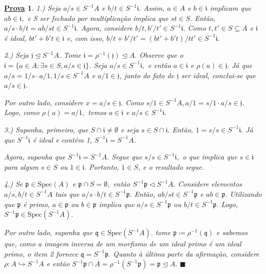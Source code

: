 \documentclass{article}
\newtheorem*{proof*}{\underline{Prova}}
\renewcommand\qedsymbol{$\blacksquare$}
\begin{document}
    \begin{proof*}
      1.) Seja \(a/s\in S^{-1}A\) e \(b/t\in S^{-1}\mathfrak{i}.\) Assim, \(a\in A\) e \(b\in \mathfrak{i}\) implicam
      que \(ab\in \mathfrak{i},\) e S ser fechado por multiplicação implica que \(st\in S.\) Então, \(a/s \cdot b/t = ab/st\in S^{-1}\mathfrak{i}.\)
      Agora, considere \(b/t, b'/t'\in S^{-1}\mathfrak{i}.\) Como \(t, t'\in S\subseteq A\) e \(\mathfrak{i}\) é ideal, \(bt'+b't\in \mathfrak{i}\) e,
      com isso, \(b/t + b'/t' = (bt'+b't)/t t'\in S^{-1}\mathfrak{i}.\)

      2.) Seja \(\mathfrak{j}\trianglelefteq{S^{-1}A}.\) Tome \(\mathfrak{i} = \rho^{-1}(\mathfrak{j})\trianglelefteq{A}.\) Observe que o
      \(\mathfrak{i} = \{a\in A:\exists s\in S, a/s\in \mathfrak{j}\}\). Seja \(a/s\in S^{-1}\mathfrak{i},\) e então
      \(a\in \mathfrak{i}\) e \(\rho (a)\in \mathfrak{j}.\) Já que \(a/s = 1/s \cdot a/1, 1/s\in S^{-1}A\) e \(a/1\in \mathfrak{j}\),
      junto do fato de \(\mathfrak{j}\) ser ideal, conclui-se que \(a/s\in \mathfrak{j}.\)

      Por outro lado, considere \(x=a/s\in \mathfrak{j}.\) Como \(s/1\in S^{-1}A, a/1 = s/1 \cdot a/s\in \mathfrak{j}.\) Logo, 
      como \(\rho (a) = a/1,\) temos \(a\in \mathfrak{i}\) e \(a/s\in S^{-1}\mathfrak{i}.\)

      3.) Suponha, primeiro, que \(S\cap \mathfrak{i} \neq\emptyset\) e seja \(s\in S\cap \mathfrak{i}.\) Então,
      \(1 = s/s\in S^{-1}\mathfrak{i}.\) Já que \(S^{-1}\mathfrak{i}\) é ideal e contém 1, \(S^{-1}\mathfrak{i} = S^{-1}A.\)

      Agora, suponha que \(S^{-1}\mathfrak{i} = S^{-1}A.\) Segue que \(s/s\in S^{-1}\mathfrak{i},\) o que implica que \(s\in \mathfrak{i}\) para algum
      \(s\in S\) ou \(1\in \mathfrak{i}.\) Portanto, \(1\in S\), e o resultado segue.

      4.) Se \(\mathfrak{p}\in \mathrm{Spec}(A)\) e \(\mathfrak{p}\cap S = \emptyset,\) então \(S^{-1}\mathfrak{p}\vartriangleleft S^{-1}A.\)
      Considere elementos \(a/s, b/t\in S^{-1}A\) tais que \(a/s \cdot b/t\in S^{-1}\mathfrak{p}.\) Então, \(ab/st\in S^{-1}\mathfrak{p}\) e \(ab\in \mathfrak{p}.\)
      Utilizando que \(\mathfrak{p}\) é primo, \(a\in \mathfrak{p}\) ou \(b\in \mathfrak{p}\) implica que \(a/s\in S^{-1}\mathfrak{p}\) ou \(b/t\in S^{-1}\mathfrak{p}.\)
      Logo, \(S^{-1}\mathfrak{p}\in \mathrm{Spec}(S^{-1}A).\)

      Por outro lado, suponha que \(\mathfrak{q}\in \mathrm{Spec}(S^{-1}A).\) tome \(\mathfrak{p}\coloneqq \rho^{-1}(\mathfrak{q})\) e
      sabemos que, como a imagem inversa de um morfismo de um ideal primo é um ideal primo, o item 2 fornece \(\mathfrak{q} = S^{-1}\mathfrak{p}.\) 
      Quanto à última parte da afirmação, considere \(\rho :A\hookrightarrow S^{-1}A\) e então \(S^{-1}\mathfrak{p}\cap A = \rho^{-1}(S^{-1}\mathfrak{p}) = \mathfrak{p} \trianglelefteq{A}.\) \qedsymbol
    \end{proof*}
\end{document}
